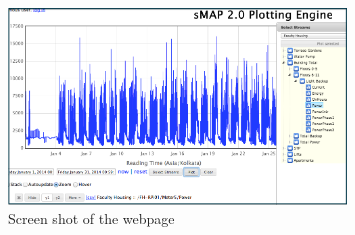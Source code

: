 \documentclass{sig-alternate}
\begin{document}
\begin{itemize}
\begin{figure}[t]
\centering
\includegraphics[width=0.8\textwidth,height=0.35\textheight]{screenshot.png}
\caption{Screen shot of the webpage}
\label{fig:screenshot}
\end{figure}


%
%
%
%
%
%
 
\end{itemize}
\end{document}
